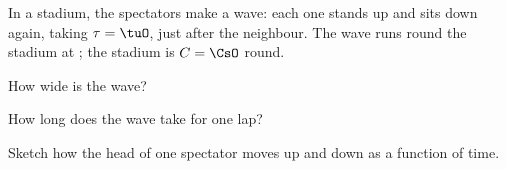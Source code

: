 In a stadium, the spectators make a wave: each one stands up and sits down again, taking $\tau = \tuO$, just after the neighbour. The wave runs round the stadium at \vO; the stadium is $C = \CsO$ round.

\begin{abcliste}
\abc How wide is the wave?

\abc How long does the wave take for one lap?

\abc Sketch how the head of one spectator moves up and down as a function of time.
\end{abcliste}
